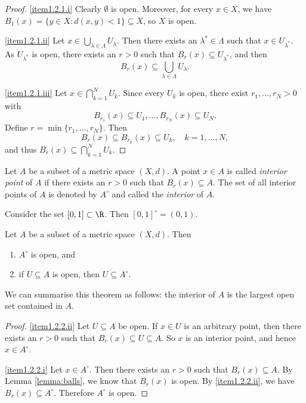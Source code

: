 \begin{proof}
\eqref{item1.2.1.i} Clearly $\emptyset$ is open. Moreover, for every $x \in X$, we have
$B_1(x)=\{y \in X: d(x,y) < 1\} \subseteq X$, so $X$ is open.
\medskip

\eqref{item1.2.1.ii} Let $x \in \bigcup_{\lambda \in \Lambda} U_\lambda$. Then there exists an $\lambda^\ast \in \Lambda$ such
that $x \in U_{\lambda^\ast}$. As $U_{\lambda^\ast}$ is open, there exists an $r > 0$ such that $B_r(x) \subseteq U_{\lambda^\ast}$, and
then
\[
B_r(x) \subseteq \bigcup_{\lambda \in \Lambda} U_\lambda.
\]
\medskip

\eqref{item1.2.1.iii} Let $x \in \bigcap_{k = 1}^N U_k$. Since every $U_k$ is open, there exist
$r_1,\ldots,r_N > 0$ with
\[
B_{r_1}(x) \subseteq U_1, \ldots, B_{r_N}(x) \subseteq U_N.
\]
Define $r = \min\{r_1,\ldots,r_N\}$. Then
\[
B_r(x) \subseteq B_{r_k}(x) \subseteq U_k, \quad k = 1,\ldots,N,
\]
and thus $B_r(x) \subseteq \bigcap_{k = 1}^N U_k$.
\end{proof}

\np

\begin{definition}[Interior]
Let $A$ be a subset of a metric space $(X,d)$. A point $x \in A$ is called \emph{interior point} 
of $A$ if there exists an $r > 0$ such that $B_r(x) \subseteq A$.
The set of all interior points of $A$ is denoted by $A^\circ$ and called the
\emph{interior} of $A$.
\end{definition}

\begin{example}
Consider the set $[0,1] \subset \R$. Then $[0,1]^\circ = (0,1)$.
\end{example}


\begin{theorem} \label{thm:interior}
Let $A$ be a subset of a metric space $(X,d)$. Then
\begin{enumerate}
\item \label{item1.2.2.i} $A^\circ$ is open, and
\item \label{item1.2.2.ii} if $U \subseteq A$ is open, then $U \subseteq A^\circ$.
\end{enumerate}
\end{theorem}

We can summarise this theorem as follows: the interior of $A$ is the largest
open set contained in $A$.

\np

\begin{proof}
\eqref{item1.2.2.ii} Let $U \subseteq A$ be open. If $x \in U$ is an
arbitrary point, then there exists an $r > 0$ such that $B_r(x) \subseteq U \subseteq A$.
So $x$ is an interior point, and hence $x \in A^\circ$.

\eqref{item1.2.2.i} Let $x \in A^\circ$. Then there exists an $r > 0$ such that
$B_r(x) \subseteq A$. By Lemma \ref{lemma:balls}, we know that $B_r(x)$ is open.
By \eqref{item1.2.2.ii}, we have $B_r(x) \subseteq A^\circ$. Therefore $A^\circ$ is open.
\end{proof}


